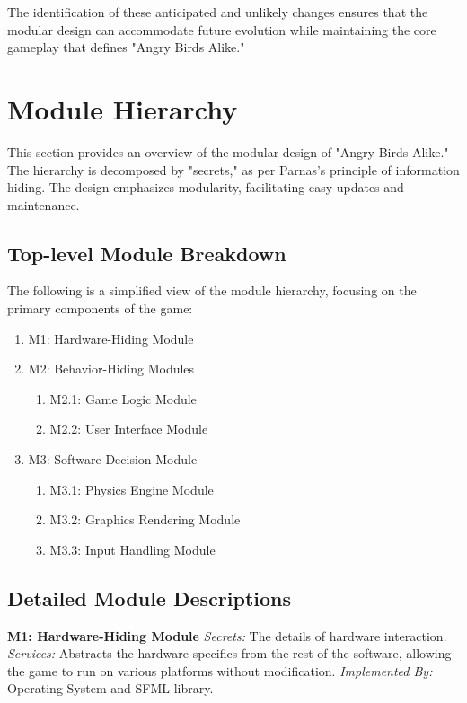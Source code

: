 \documentclass[12pt]{article}
\begin{document}
The identification of these anticipated and unlikely changes ensures that the modular design can accommodate future evolution while maintaining the core gameplay that defines "Angry Birds Alike."

\section{Module Hierarchy}

This section provides an overview of the modular design of "Angry Birds Alike." The hierarchy is decomposed by "secrets," as per Parnas's principle of information hiding. The design emphasizes modularity, facilitating easy updates and maintenance.

\subsection{Top-level Module Breakdown}
The following is a simplified view of the module hierarchy, focusing on the primary components of the game:

\begin{enumerate}
    \item M1: Hardware-Hiding Module
    \item M2: Behavior-Hiding Modules
        \begin{enumerate}
            \item M2.1: Game Logic Module
            \item M2.2: User Interface Module
        \end{enumerate}
    \item M3: Software Decision Module
        \begin{enumerate}
            \item M3.1: Physics Engine Module
            \item M3.2: Graphics Rendering Module
            \item M3.3: Input Handling Module
        \end{enumerate}
\end{enumerate}

\subsection{Detailed Module Descriptions}

\textbf{M1: Hardware-Hiding Module}
\textit{Secrets:} The details of hardware interaction.
\textit{Services:} Abstracts the hardware specifics from the rest of the software, allowing the game to run on various platforms without modification.
\textit{Implemented By:} Operating System and SFML library.
\end{document}
